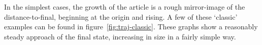 In the simplest cases, the growth of the article is a rough
mirror-image of the distance-to-final, beginning at the origin and
rising. A few of these `classic' examples can be found in
figure~\ref{fig:traj-classic}. These graphs show a reasonably steady
approach of the final state, increasing in size in a fairly simple
way.

\begin{figure}
  \centering
\end{figure}
